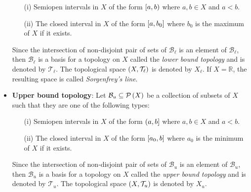 \begin{example}
\begin{itemize}
      \begin{itemize}
        \item[(i)] Semiopen intervals in $X$ of the form $\bpr{a,b}$ where $a,b\in X$ and $a<b$.
        \item[(ii)] The closed interval in $X$ of the form $\br{a,b_0}$ where $b_0$ is the maximum of $X$ if it exists.
      \end{itemize}

      Since the intersection of non-disjoint pair of sets of $\mathcal{B}_{\ell}$ is an element of $\mathcal{B}_{\ell}$, then $\mathcal{B}_{\ell}$ is a basis for a topology on $X$ called the \emph{lower bound topology} and is denoted by $\mathcal{T}_{\ell}$. The topological space $\pr{X,\mathcal{T}_{\ell}}$ is denoted by $X_{\ell}$. If $X=\mathbb{R}$, the resulting space is called \emph{Sorgenfrey's line}.
      
      \item \textbf{Upper bound topology}: Let $\mathcal{B}_{u}\subseteq\mathcal{P}\left(X\right)$ be a collection of subsets of $X$ such that they are one of the following types:

      \begin{itemize}
        \item[(i)] Semiopen intervals in $X$ of the form $\left(a,b\right]$ where $a,b\in X$ and $a<b$.
        \item[(ii)] The closed interval in $X$ of the form $\left[a_0,b\right]$ where $a_0$ is the minimum of $X$ if it exists.
      \end{itemize}

      Since the intersection of non-disjoint pair of sets of $\mathcal{B}_u$ is an element of $\mathcal{B}_u$, then $\mathcal{B}_u$ is a basis for a topology on $X$ called the \emph{upper bound topology} and is denoted by $\mathcal{T}_u$. The topological space $\left(X,\mathcal{T}_u\right)$ is denoted by $X_u$.
  \end{itemize}
\end{example}


